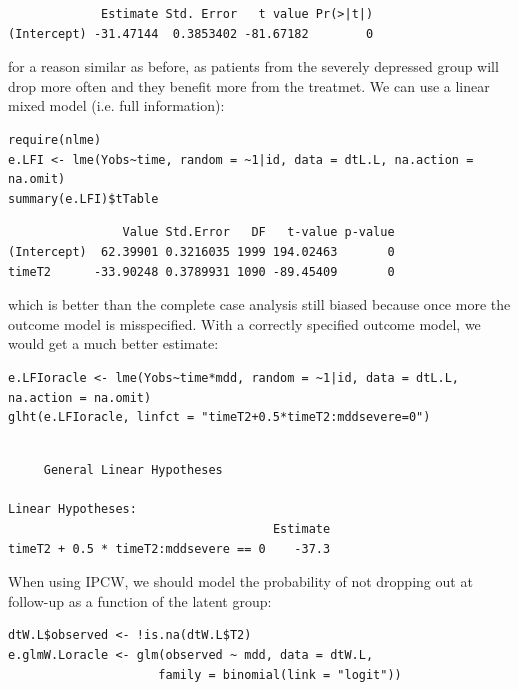 \documentclass[12pt]{article}
\begin{document}
\begin{verbatim}
             Estimate Std. Error   t value Pr(>|t|)
(Intercept) -31.47144  0.3853402 -81.67182        0
\end{verbatim}


for a reason similar as before, as patients from the severely
depressed group will drop more often and they benefit more from the
treatmet. We can use a linear mixed model (i.e. full information):
\lstset{language=r,label= ,caption= ,captionpos=b,numbers=none}
\begin{lstlisting}
require(nlme)
e.LFI <- lme(Yobs~time, random = ~1|id, data = dtL.L, na.action = na.omit)
summary(e.LFI)$tTable
\end{lstlisting}

\begin{verbatim}
                Value Std.Error   DF   t-value p-value
(Intercept)  62.39901 0.3216035 1999 194.02463       0
timeT2      -33.90248 0.3789931 1090 -89.45409       0
\end{verbatim}

which is better than the complete case analysis still biased because
once more the outcome model is misspecified. With a correctly
specified outcome model, we would get a much better estimate:
\lstset{language=r,label= ,caption= ,captionpos=b,numbers=none}
\begin{lstlisting}
e.LFIoracle <- lme(Yobs~time*mdd, random = ~1|id, data = dtL.L, na.action = na.omit)
glht(e.LFIoracle, linfct = "timeT2+0.5*timeT2:mddsevere=0")

\end{lstlisting}

\begin{verbatim}

	 General Linear Hypotheses

Linear Hypotheses:
                                     Estimate
timeT2 + 0.5 * timeT2:mddsevere == 0    -37.3
\end{verbatim}


\bigskip

 When using IPCW, we should model the probability of not dropping out
at follow-up as a function of the latent group:
\lstset{language=r,label= ,caption= ,captionpos=b,numbers=none}
\begin{lstlisting}
dtW.L$observed <- !is.na(dtW.L$T2)
e.glmW.Loracle <- glm(observed ~ mdd, data = dtW.L,
                     family = binomial(link = "logit"))
\end{lstlisting}
\end{document}
